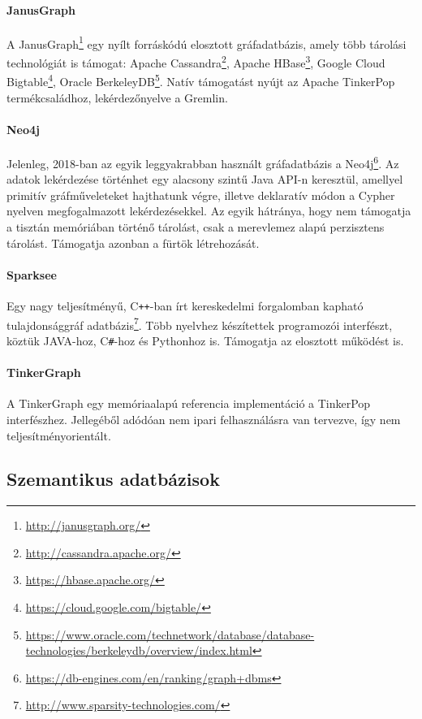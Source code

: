 \paragraph{JanusGraph} A JanusGraph\footnote{\url{http://janusgraph.org/}} egy nyílt forráskódú elosztott gráfadatbázis, amely több tárolási technológiát is támogat: Apache Cassandra\footnote{\url{http://cassandra.apache.org/}}, Apache HBase\footnote{\url{https://hbase.apache.org/}}, Google Cloud Bigtable\footnote{\url{https://cloud.google.com/bigtable/}}, Oracle BerkeleyDB\footnote{\url{https://www.oracle.com/technetwork/database/database-technologies/berkeleydb/overview/index.html}}. Natív támogatást nyújt az Apache TinkerPop termékcsaládhoz, lekérdezőnyelve a Gremlin.

\paragraph{Neo4j} Jelenleg, 2018-ban az egyik leggyakrabban használt gráfadatbázis a Neo4j\footnote{\url{https://db-engines.com/en/ranking/graph+dbms}}. Az adatok lekérdezése történhet egy alacsony szintű Java API-n keresztül, amellyel primitív gráfműveleteket hajthatunk végre, illetve deklaratív módon a Cypher nyelven megfogalmazott lekérdezésekkel. Az egyik hátránya, hogy nem támogatja a tisztán memóriában történő tárolást, csak a merevlemez alapú perzisztens tárolást. Támogatja azonban a fürtök létrehozását.

\paragraph{Sparksee} Egy nagy teljesítményű, C\texttt{++}-ban írt kereskedelmi forgalomban kapható tulajdonsággráf adatbázis\footnote{\url{http://www.sparsity-technologies.com/}}. Több nyelvhez készítettek programozói interfészt, köztük JAVA-hoz, C\texttt{\#}-hoz és Pythonhoz is. Támogatja az elosztott működést is.

\paragraph{TinkerGraph} A TinkerGraph egy memóriaalapú referencia implementáció a TinkerPop interfészhez. Jellegéből adódóan nem ipari felhasználásra van tervezve, így nem teljesítményorientált.

\subsection{Szemantikus adatbázisok}
